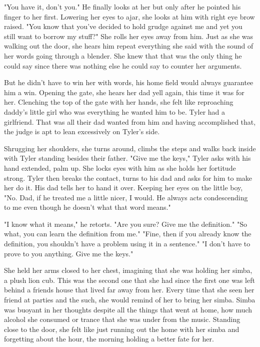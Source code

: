 \begin{Document}
        "You have it, don't you." He finally looks at her but only after he pointed his finger to her first. Lowering her eyes to ajar, she looks at him with
    right eye brow raised. "You know that you've decided to hold grudge against me and yet you still want to borrow my stuff?" She rolls her eyes
    away from him. Just as she was walking out the door, she hears him repeat everything she said with the sound of her words going through a 
    blender. She knew that that was the only thing he could say since there was nothing else he could say to counter her arguments.

        But he didn't have to win her with words, his home field would always guarantee him a win. Opening the gate, she hears her dad yell again,
    this time it was for her. Clenching the top of the gate with her hands, she felt like reproaching daddy's little girl who was everything he
    wanted him to be. Tyler had a girlfriend. That was all their dad wanted from him and having accomplished that, the judge is apt to lean excessively
    on Tyler's side.

        Shrugging her shoulders, she turns around, climbs the steps and walks back inside with Tyler standing besides their father. "Give me the keys,"
    Tyler asks with his hand extended, palm up. She locks eyes with him as she holds her fortitude strong. Tyler then breaks the contact, turns to his dad
    and asks for him to make her do it. His dad tells her to hand it over. Keeping her eyes on the little boy, "No. Dad, if he treated me a little
    nicer, I would. He always acts condescending to me even though he doesn't what that word means."

        "I know what it means," he retorts. "Are you sure? Give me the definition." "So what, you can learn the definition from me." "Fine, then if
    you already know the definition, you shouldn't have a problem using it in a sentence." "I don't have to prove to you anything. Give me the keys."

        She held her arms closed to her chest, imagining that she was holding her simba, a plush lion cub. This was the second one that she had since
    the first one was left behind a friends house that lived far away from her. Every time that she seen her friend at parties and the such, she would
    remind of her to bring her simba. Simba was buoyant in her thoughts despite all the things that went at home, how much alcohol she consumed or
    trance that she was under from the music. Standing close to the door, she felt like just running out the home with her simba and forgetting about
    the hour, the morning holding a better fate for her.


\end{Document}
